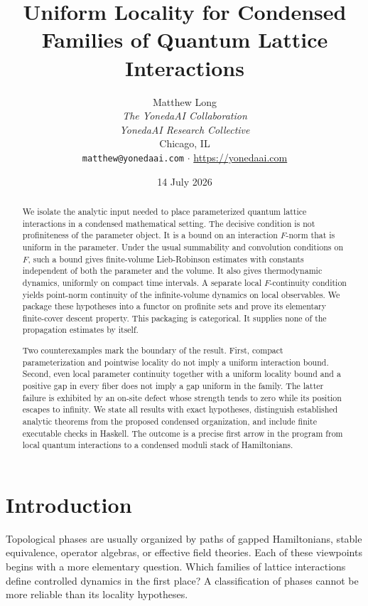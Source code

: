 \documentclass[12pt]{article}
\title{Uniform Locality for Condensed Families of Quantum Lattice Interactions}
\author{Matthew Long \\
\textit{The YonedaAI Collaboration} \\
\textit{YonedaAI Research Collective} \\
Chicago, IL \\
\texttt{matthew@yonedaai.com} $\cdot$ \url{https://yonedaai.com}}
\date{14 July 2026}
\theoremstyle{definition}
\theoremstyle{remark}
\begin{document}
\maketitle

\begin{abstract}
We isolate the analytic input needed to place parameterized quantum lattice
interactions in a condensed mathematical setting.  The decisive condition is
not profiniteness of the parameter object.  It is a bound on an interaction
$F$-norm that is uniform in the parameter.  Under the usual summability and
convolution conditions on $F$, such a bound gives finite-volume
Lieb-Robinson estimates with constants independent of both the parameter and
the volume.  It also gives thermodynamic dynamics, uniformly on compact time
intervals.  A separate local $F$-continuity condition yields point-norm
continuity of the infinite-volume dynamics on local observables.  We package
these hypotheses into a functor on profinite sets and prove its elementary
finite-cover descent property.  This packaging is categorical.  It supplies
none of the propagation estimates by itself.

Two counterexamples mark the boundary of the result.  First, compact
parameterization and pointwise locality do not imply a uniform interaction
bound.  Second, even local parameter continuity together with a uniform
locality bound and a positive gap in every fiber does not imply a gap uniform
in the family.  The latter failure is exhibited by an on-site defect whose
strength tends to zero while its position escapes to infinity.  We state all
results with exact hypotheses, distinguish established analytic theorems from
the proposed condensed organization, and include finite executable checks in
Haskell.  The outcome is a precise first arrow in the program from local
quantum interactions to a condensed moduli stack of Hamiltonians.
\end{abstract}

\tableofcontents

\section{Introduction}

Topological phases are usually organized by paths of gapped Hamiltonians,
stable equivalence, operator algebras, or effective field theories.  Each of
these viewpoints begins with a more elementary question.  Which families of
lattice interactions define controlled dynamics in the first place?  A
classification of phases cannot be more reliable than its locality
hypotheses.
\end{document}
